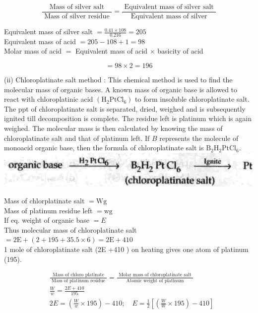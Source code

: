 \documentclass[10pt]{article}
\begin{document}
$$
\frac{\text { Mass of silver salt }}{\text { Mass of silver residue }}=\frac{\text { Equivalent mass of silver salt }}{\text { Equivalent mass of silver }}
$$

Equivalent mass of silver salt $=\frac{0.41 \times 108}{0.216}=205$\\
Equivalent mass of acid $=205-108+1=98$\\
Molar mass of acid $=$ Equivalent mass of acid $\times$ basicity of acid

$$
=98 \times 2=196
$$

(ii) Chloroplatinate salt method : This chemical method is used to find the molecular mass of organic bases. A known mass of organic base is allowed to react with chloroplatinic acid $\left(\mathrm{H}_{2} \mathrm{PtCl}_{6}\right)$ to form insoluble chloroplatinate salt. The ppt of chloroplatinate salt is separated, dried, weighed and is subsequently ignited till decomposition is complete. The residue left is platinum which is again weighed. The molecular mass is then calculated by knowing the mass of chloroplatinate salt and that of platinum left. If $B$ represents the molecule of monoacid organic base, then the formula of chloroplatinate salt is $\mathrm{B}_{2} \mathrm{H}_{2} \mathrm{Pt} \mathrm{Cl}_{6}$.\\
\includegraphics[max width=\textwidth, center]{2025_01_28_8470952b98110cec3aabg-111}

Mass of chlorplatinate salt $=\mathrm{Wg}$\\
Mass of platinum residue left $=\mathrm{wg}$\\
If eq. weight of organic base $=E$\\
Thus molecular mass of chloroplatinate salt $=2 \mathrm{E}+(2+195+35.5 \times 6)=2 \mathrm{E}+410$\\
1 mole of chloroplatinate salt (2E +410 ) on heating gives one atom of platinum (195).

$$
\begin{aligned}
& \frac{\text { Mass of chloro platinate }}{\text { Mass of platinum residue }}=\frac{\text { Molar mass of chloroplatinate salt }}{\text { Atomic weight of platinum }} \\
& \frac{W}{w}=\frac{2 E+410}{195} \\
& 2 E=\left(\frac{W}{w} \times 195\right)-410 ; \quad E=\frac{1}{2}\left[\left(\frac{W}{W} \times 195\right)-410\right]
\end{aligned}
$$
\end{document}
